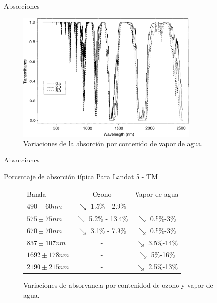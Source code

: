 \documentclass[]{beamer}
\begin{document}
\begin{frame}{Absorciones}
  \begin{figure}
  \centering
  \includegraphics[width=0.8\textwidth]{imagenes/vapor.png}
  \caption{Variaciones de la absorción por contenido de vapor de agua.}
  \end{figure}
\end{frame}


\begin{frame}{Absorciones}
  \begin{exampleblock}{Porcentaje de absorción típica}
    Para Landat 5 - TM
    \begin{figure}
      \begin{tabular}{l c c}
        Banda & Ozono  & Vapor de agua    \\
        $490\pm60 nm$& $\searrow$ 1.5\% - 2.9\%     & -  \\
        $575\pm75 nm$& $\searrow$ 5.2\% - 13.4\%    & $\searrow$ 0.5\%-3\%  \\
        $670\pm70 nm$& $\searrow$ 3.1\% - 7.9\%     & $\searrow$ 0.5\%-3\%  \\
        $837\pm107 nm$& -                 & $\searrow$ 3.5\%-14\%  \\
        $1692\pm178 nm$& -                 & $\searrow$ 5\%-16\% \\
        $2190\pm215 nm$& -                 & $\searrow$ 2.5\%-13\% \\
      \end{tabular}
      \caption{Variaciones de absorvancia por contenidod de ozono y vapor de agua. }
    \end{figure}
  \end{exampleblock}
\end{frame}
\end{document}
